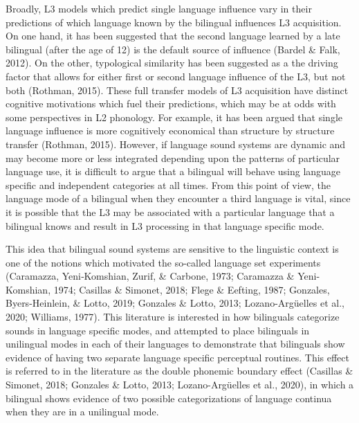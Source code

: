 \documentclass[
  english,
  man]{apa6}
\begin{document}
Broadly, L3 models which predict single language influence vary in their predictions of which language known by the bilingual influences L3 acquisition. On one hand, it has been suggested that the second language learned by a late bilingual (after the age of 12) is the default source of influence (Bardel \& Falk, 2012).
On the other, typological similarity has been suggested as a the driving factor that allows for either first or second language influence of the L3, but not both (Rothman, 2015).
These full transfer models of L3 acquisition have distinct cognitive motivations which fuel their predictions, which may be at odds with some perspectives in L2 phonology.
For example, it has been argued that single language influence is more cognitively economical than structure by structure transfer (Rothman, 2015).
However, if language sound systems are dynamic and may become more or less integrated depending upon the patterns of particular language use, it is difficult to argue that a bilingual will behave using language specific and independent categories at all times.
From this point of view, the language mode of a bilingual when they encounter a third language is vital, since it is possible that the L3 may be associated with a particular language that a bilingual knows and result in L3 processing in that language specific mode.

This idea that bilingual sound systems are sensitive to the linguistic context is one of the notions which motivated the so-called language set experiments
(Caramazza, Yeni‐Komshian, Zurif, \& Carbone, 1973; Caramazza \& Yeni-Komshian, 1974; Casillas \& Simonet, 2018; Flege \& Eefting, 1987; Gonzales, Byers-Heinlein, \& Lotto, 2019; Gonzales \& Lotto, 2013; Lozano-Argüelles et al., 2020; Williams, 1977).
This literature is interested in how bilinguals categorize sounds in language specific modes, and attempted to place bilinguals in unilingual modes in each of their languages to demonstrate that bilinguals show evidence of having two separate language specific perceptual routines.
This effect is referred to in the literature as the double phonemic boundary effect (Casillas \& Simonet, 2018; Gonzales \& Lotto, 2013; Lozano-Argüelles et al., 2020), in which a bilingual shows evidence of two possible categorizations of language continua when they are in a unilingual mode.
\end{document}
